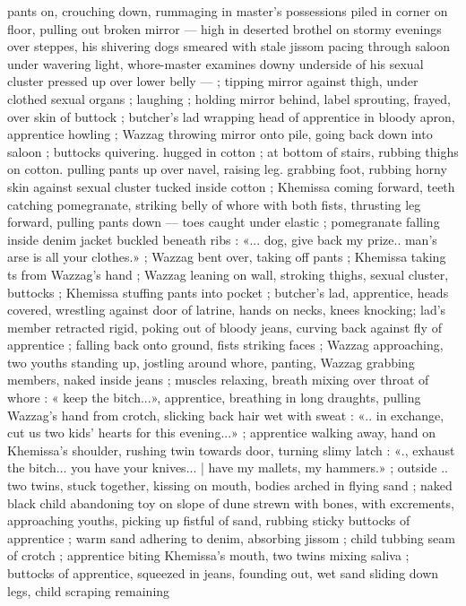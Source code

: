 pants on, crouching down, rummaging in master's possessions piled
in corner on floor, pulling out broken mirror --- high in deserted
brothel on stormy evenings over steppes, his shivering dogs
smeared with stale jissom pacing through saloon under wavering
light, whore-master examines downy underside of his sexual cluster
pressed up over lower belly --- ; tipping mirror against thigh, under
clothed sexual organs ; laughing ; holding mirror behind, label
sprouting, frayed, over skin of buttock ; butcher's lad wrapping head
of apprentice in bloody apron, apprentice howling ; Wazzag throwing
mirror onto pile, going back down into saloon ; buttocks quivering.
hugged in cotton ; at bottom of stairs, rubbing thighs on cotton.
pulling pants up over navel, raising leg. grabbing foot, rubbing horny
skin against sexual cluster tucked inside cotton ; Khemissa coming
forward, teeth catching pomegranate, striking belly of whore with
both fists, thrusting leg forward, pulling pants down --- toes caught
under elastic ; pomegranate falling inside denim jacket buckled
beneath ribs : «... dog, give back my prize.. man’s arse is all your
clothes.» ; Wazzag bent over, taking off pants ; Khemissa taking
ts from Wazzag's hand ; Wazzag leaning on wall, stroking thighs,
sexual cluster, buttocks ; Khemissa stuffing pants into pocket ;
butcher's lad, apprentice, heads covered, wrestling against door of
latrine, hands on necks, knees knocking; lad’s member retracted
rigid, poking out of bloody jeans, curving back against fly of
apprentice ; falling back onto ground, fists striking faces ; Wazzag
approaching, two youths standing up, jostling around whore, panting,
Wazzag grabbing members, naked inside jeans ; muscles relaxing,
breath mixing over throat of whore : « keep the bitch...», apprentice,
breathing in long draughts, pulling Wazzag's hand from crotch,
slicking back hair wet with sweat : «.. in exchange, cut us two kids’
hearts for this evening...» ; apprentice walking away, hand on
Khemissa's shoulder, rushing twin towards door, turning slimy latch :
«., exhaust the bitch... you have your knives... | have my mallets, my
hammers.» ; outside .. two twins, stuck together, kissing on mouth,
bodies arched in flying sand ; naked black child abandoning toy on
slope of dune strewn with bones, with excrements, approaching
youths, picking up fistful of sand, rubbing sticky buttocks of
apprentice ; warm sand adhering to denim, absorbing jissom ; child
tubbing seam of crotch ; apprentice biting Khemissa's mouth, two
twins mixing saliva ; buttocks of apprentice, squeezed in jeans,
founding out, wet sand sliding down legs, child scraping remaining
